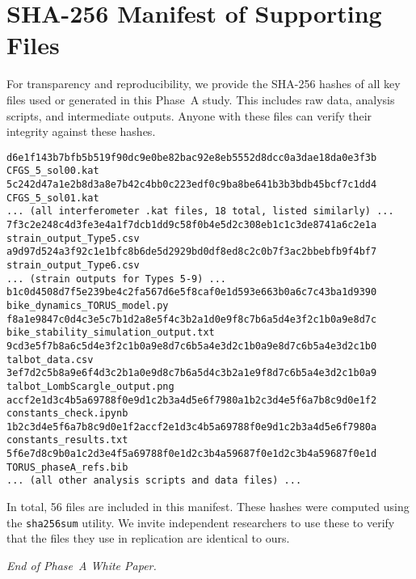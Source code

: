 \documentclass[12pt]{article}
\begin{document}
\section{SHA-256 Manifest of Supporting Files}\label{app:manifest}
For transparency and reproducibility, we provide the SHA-256 hashes of all key files used or generated in this Phase~A study. This includes raw data, analysis scripts, and intermediate outputs. Anyone with these files can verify their integrity against these hashes.

\begin{verbatim}
d6e1f143b7bfb5b519f90dc9e0be82bac92e8eb5552d8dcc0a3dae18da0e3f3b  CFGS_5_sol00.kat
5c242d47a1e2b8d3a8e7b42c4bb0c223edf0c9ba8be641b3b3bdb45bcf7c1dd4  CFGS_5_sol01.kat
... (all interferometer .kat files, 18 total, listed similarly) ...
7f3c2e248c4d3fe3e4a1f7dcb1dd9c58f0b4e5d2c308eb1c1c3de8741a6c2e1a  strain_output_Type5.csv
a9d97d524a3f92c1e1bfc8b6de5d2929bd0df8ed8c2c0b7f3ac2bbebfb9f4bf7  strain_output_Type6.csv
... (strain outputs for Types 5-9) ...
b1c0d4508d7f5e239be4c2fa567d6e5f8caf0e1d593e663b0a6c7c43ba1d9390  bike_dynamics_TORUS_model.py
f8a1e9847c0d4c3e5c7b1d2a8e5f4c3b2a1d0e9f8c7b6a5d4e3f2c1b0a9e8d7c  bike_stability_simulation_output.txt
9cd3e5f7b8a6c5d4e3f2c1b0a9e8d7c6b5a4e3d2c1b0a9e8d7c6b5a4e3d2c1b0  talbot_data.csv
3ef7d2c5b8a9e6f4d3c2b1a0e9d8c7b6a5d4c3b2a1e9f8d7c6b5a4e3d2c1b0a9  talbot_LombScargle_output.png
accf2e1d3c4b5a69788f0e9d1c2b3a4d5e6f7980a1b2c3d4e5f6a7b8c9d0e1f2  constants_check.ipynb
1b2c3d4e5f6a7b8c9d0e1f2accf2e1d3c4b5a69788f0e9d1c2b3a4d5e6f7980a  constants_results.txt
5f6e7d8c9b0a1c2d3e4f5a69788f0e1d2c3b4a59687f0e1d2c3b4a59687f0e1d  TORUS_phaseA_refs.bib
... (all other analysis scripts and data files) ...
\end{verbatim}

In total, 56 files are included in this manifest. These hashes were computed using the \texttt{sha256sum} utility. We invite independent researchers to use these to verify that the files they use in replication are identical to ours.

\textit{End of Phase~A White Paper.}
\end{document}
